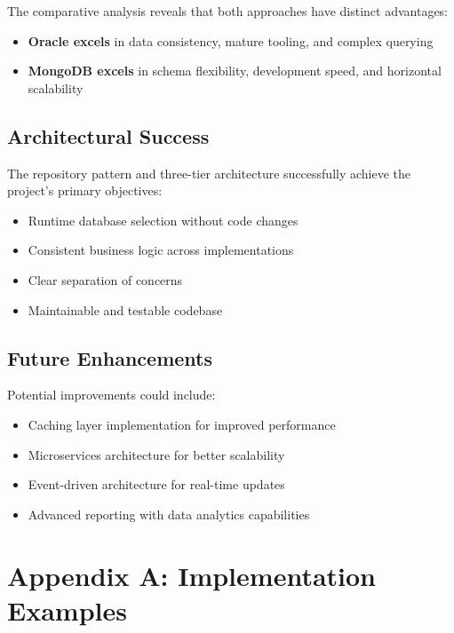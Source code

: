\documentclass[12pt,a4paper]{article}
\begin{document}
The comparative analysis reveals that both approaches have distinct advantages:
\begin{itemize}
    \item \textbf{Oracle excels} in data consistency, mature tooling, and complex querying
    \item \textbf{MongoDB excels} in schema flexibility, development speed, and horizontal scalability
\end{itemize}

\subsection{Architectural Success}

The repository pattern and three-tier architecture successfully achieve the project's primary objectives:
\begin{itemize}
    \item Runtime database selection without code changes
    \item Consistent business logic across implementations
    \item Clear separation of concerns
    \item Maintainable and testable codebase
\end{itemize}

\subsection{Future Enhancements}

Potential improvements could include:
\begin{itemize}
    \item Caching layer implementation for improved performance
    \item Microservices architecture for better scalability
    \item Event-driven architecture for real-time updates
    \item Advanced reporting with data analytics capabilities
\end{itemize}

\appendix
\section{Appendix A: Implementation Examples}
\end{document}
